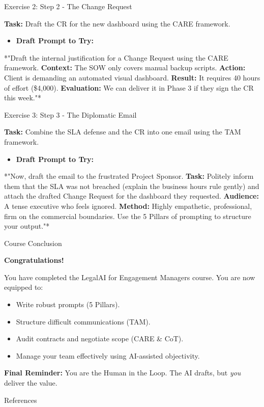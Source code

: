 \documentclass[aspectratio=169]{beamer}
\begin{document}
\begin{frame}[fragile]{Exercise 2: Step 2 - The Change Request}


\textbf{Task:} Draft the CR for the new dashboard using the CARE framework.

\begin{itemize}
  \item \textbf{Draft Prompt to Try:}
\end{itemize}
*"Draft the internal justification for a Change Request using the CARE framework.
\textbf{Context:} The SOW only covers manual backup scripts.
\textbf{Action:} Client is demanding an automated visual dashboard.
\textbf{Result:} It requires 40 hours of effort (\$4,000).
\textbf{Evaluation:} We can deliver it in Phase 3 if they sign the CR this week."*

\end{frame}



\begin{frame}[fragile]{Exercise 3: Step 3 - The Diplomatic Email}


\textbf{Task:} Combine the SLA defense and the CR into one email using the TAM framework.

\begin{itemize}
  \item \textbf{Draft Prompt to Try:}
\end{itemize}
*"Now, draft the email to the frustrated Project Sponsor.
\textbf{Task:} Politely inform them that the SLA was not breached (explain the business hours rule gently) and attach the drafted Change Request for the dashboard they requested.
\textbf{Audience:} A tense executive who feels ignored.
\textbf{Method:} Highly empathetic, professional, firm on the commercial boundaries. Use the 5 Pillars of prompting to structure your output."*

\end{frame}



\begin{frame}[fragile]{Course Conclusion}


\textbf{Congratulations!}

You have completed the LegalAI for Engagement Managers course. You are now equipped to:
\begin{itemize}
  \item Write robust prompts (5 Pillars).
  \item Structure difficult communications (TAM).
  \item Audit contracts and negotiate scope (CARE \& CoT).
  \item Manage your team effectively using AI-assisted objectivity.
\end{itemize}
\textbf{Final Reminder:} You are the Human in the Loop. The AI drafts, but \textit{you} deliver the value.
\end{frame}




\begin{frame}[allowframebreaks]{References}
  
  
\end{frame}
\end{document}
